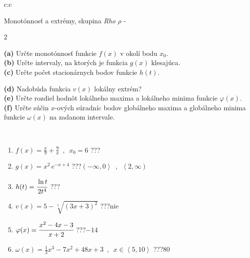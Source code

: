 \documentclass[10pt]{report}
\begin{document}
\newpage
\thispagestyle{empty}
\begin{tabular}{c:c}
\begin{minipage}[c][104.5mm][t]{0.5\linewidth}
\begin{center}
\vspace{7mm}
{\huge Monotónnosť a extrémy, skupina \textit{Rho $\rho$} -}\\[5mm]
\begin{minipage}{0.95\linewidth}
\begin{center}
{\small \begin{multicols}{2} \raggedright
\textbf{(a)} Určte monotónnosť funkcie \(f(x)\) v okolí bodu \(x_0\). \\[1mm]
\textbf{(b)} Určte intervaly, na ktorých je funkcia \(g(x)\) klesajúca. \\[1mm]
\textbf{(c)} Určte počet stacionárnych bodov funkcie \(h(t)\). \par \columnbreak
\textbf{(d)} Nadobúda funkcia \(v(x)\) lokálny extrém? \\[1mm]
\textbf{(e)} Určte rozdiel hodnôt lokálneho maxima a lokálneho minima funkcie \(\varphi(x)\). \\[1mm]
\textbf{(f)} Určte súčin \(x\)-ových súradníc bodov globálneho maxima a globálneho minima funkcie \(\omega(x)\) na zadanom intervale. \\[1mm]
\end{multicols}
}
\end{center}
\end{minipage}
\\[4mm]
\begin{minipage}{0.79\linewidth}
\begin{center}
\begin{varwidth}{\linewidth}
\begin{enumerate}
\normalsize
\item $f(x)=\frac{x}{9}+\frac{9}{x} \enspace , \enspace x_0=6$\quad \dotfill\; ???\;\dotfill \quad {}
\item $g(x)=x^2\, e^{-x+4}$\quad \dotfill\; ???\;\dotfill \quad $\left(-\infty , 0\right\rangle\enspace , \enspace \left\langle2 , \infty\right)$
\item $h(t)=\cfrac{\ln t}{2t^4}$\quad \dotfill\; ???\;\dotfill {}
\item $v(x)=5-\sqrt[5]{(3x+3)^2}$\quad \dotfill\; ???\;\dotfill \quad $\text{nie}$
\item $\varphi(x)=\cfrac{x^2-4x-3}{x+2}$\quad \dotfill\; ???\;\dotfill \quad $-14$
\item $\omega(x)=\frac{1}{3}x^3-7x^2+48x+3 \enspace , \enspace x\in\left\langle5 , 10\right\rangle$\quad \dotfill\; ???\;\dotfill \quad $80$

\end{enumerate}
\end{varwidth}
\end{center}
\end{minipage}
\end{center}
\end{minipage}
\end{tabular}
\end{document}
